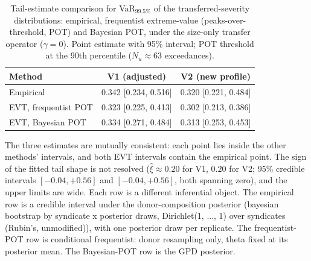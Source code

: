 \begin{table}[htbp]
\centering
\caption{Tail-estimate comparison for VaR$_{99.5\%}$ of the transferred-severity distributions: empirical, frequentist extreme-value (peaks-over-threshold, POT) and Bayesian POT, under the size-only transfer operator ($\gamma=0$). Point estimate with 95\% interval; POT threshold at the 90th percentile ($N_u\approx63$ exceedances).}
\label{tab:tail_comparison}
\begin{tabular}{lcc}
\toprule
\textbf{Method} & \textbf{V1 (adjusted)} & \textbf{V2 (new profile)} \\
\midrule
Empirical & 0.342 [0.234, 0.516] & 0.320 [0.221, 0.484] \\
EVT, frequentist POT & 0.323 [0.225, 0.413] & 0.302 [0.213, 0.386] \\
EVT, Bayesian POT & 0.334 [0.271, 0.484] & 0.313 [0.253, 0.453] \\
\bottomrule
\end{tabular}
\vspace{2pt}
{\footnotesize The three estimates are mutually consistent: each point lies inside the other methods' intervals, and both EVT intervals contain the empirical point. The sign of the fitted tail shape is not resolved ($\hat\xi\approx0.20$ for V1, $0.20$ for V2; 95\% credible intervals $[-0.04,+0.56]$ and $[-0.04,+0.56]$, both spanning zero), and the upper limits are wide. Each row is a different inferential object. The empirical row is a credible interval under the donor-composition posterior (bayesian bootstrap by syndicate x posterior draws, Dirichlet(1, ..., 1) over syndicates (Rubin's, unmodified)), with one posterior draw per replicate. The frequentist-POT row is conditional frequentist: donor resampling only, theta fixed at its posterior mean. The Bayesian-POT row is the GPD posterior.}
\end{table}
